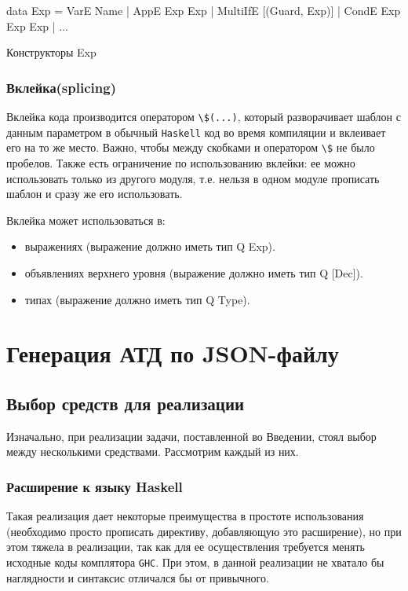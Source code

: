 \begin{ListingEnv}[H]
\begin{Verb}
data Exp
       = VarE Name
       | AppE Exp Exp
       | MultiIfE [(Guard, Exp)]
       | CondE Exp Exp Exp
       | ...
\end{Verb}
\caption{Конструкторы Exp}
\label{listing:expConstr}
\end{ListingEnv}

\subsection{Вклейка(splicing)}

Вклейка кода производится оператором  \lstinline{\$(...)}, который разворачивает шаблон с данным параметром в обычный \lstinline{Haskell} код во время компиляции и вклеивает его на то же место. Важно, чтобы между скобками и оператором \lstinline{\$} не было пробелов. Также есть ограничение по использованию вклейки: ее можно использовать только из другого модуля, т.е. нельзя в одном модуле прописать шаблон и сразу же его использовать.

Вклейка может использоваться в:

\begin{itemize}
  \item выражениях (выражение должно иметь тип Q Exp).
  \item объявлениях верхнего уровня (выражение должно иметь тип Q [Dec]).
  \item типах (выражение должно иметь тип Q Type).
\end{itemize}

\chapter{Генерация АТД по JSON-файлу}

\section{Выбор средств для реализации}

Изначально, при реализации задачи, поставленной во Введении, стоял выбор между несколькими средствами. Рассмотрим каждый из них.

\subsection{Расширение к языку Haskell}

Такая реализация дает некоторые преимущества в простоте использования (необходимо просто прописать директиву, добавляющую это расширение), но при этом тяжела в реализации, так как для ее осуществления требуется менять исходные коды комплятора  \lstinline{GHC}. При этом, в данной реализации не хватало бы наглядности и синтаксис отличался бы от привычного.

